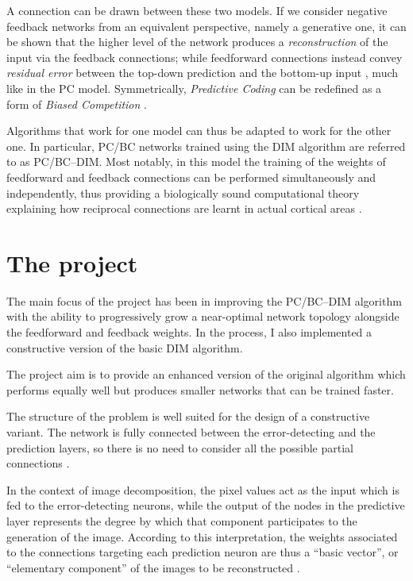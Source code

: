 \documentclass[11pt,a4paper]{report}
\newcommand{\quot}[1]{``#1''}
\begin{document}
			A connection can be drawn between these two models. If we consider negative feedback networks from an equivalent perspective, namely a generative one, it can be shown that the higher level of the network produces a \emph{reconstruction} of the input via the feedback connections; while feedforward connections instead convey \emph{residual error} between the top-down prediction and the bottom-up input \cite{spratling2009unsupervised}, much like in the PC model. Symmetrically, \emph{Predictive Coding} can be redefined as a form of \emph{Biased Competition} \cite{spratling2008predictive}.
		
			Algorithms that work for one model can thus be adapted to work for the other one. In particular, PC/BC networks trained using the DIM algorithm are referred to as PC/BC--DIM. Most notably, in this model the training of the weights of feedforward and feedback connections can be performed simultaneously and independently, thus providing a biologically sound computational theory explaining how reciprocal connections are learnt in actual cortical areas \cite{callaway1998local,spratling2012unsupervised}.
		
		\section{The project}
			The main focus of the project has been in improving the PC/BC--DIM algorithm with the ability to progressively grow a near-optimal network topology alongside the feedforward and feedback weights. In the process, I also implemented a constructive version of the basic DIM algorithm.
		
			The project aim is to provide an enhanced version of the original algorithm which performs equally well but produces smaller networks that can be trained faster.
		
			The structure of the problem is well suited for the design of a constructive variant. The network is fully connected between the error-detecting and the prediction layers, so there is no need to consider all the possible partial connections \cite{?}.
		
			In the context of image decomposition, the pixel values act as the input which is fed to the error-detecting neurons, while the output of the nodes in the predictive layer represents the degree by which that component participates to the generation of the image. According to this interpretation, the weights associated to the connections targeting each prediction neuron are thus a \quot{basic vector}, or \quot{elementary component} of the images to be reconstructed \cite{spratling2014predictive}.
\end{document}
